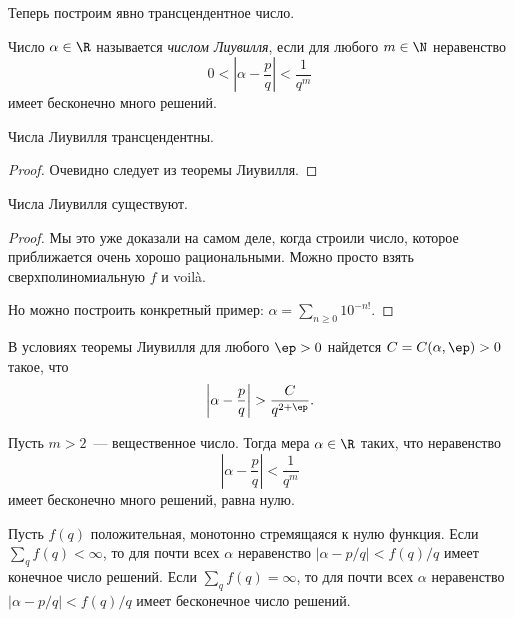 Теперь построим явно трансцендентное число.

\begin{df}
  Число $\alpha \in \R$ называется \emph{числом Лиувилля}, если для любого $m \in \N$ неравенство
  $$
    0 < \left| \alpha - \frac{p}{q} \right| < \frac{1}{q^m}
  $$
  имеет бесконечно много решений.
\end{df}

\begin{theorem}
  Числа Лиувилля трансцендентны.
\end{theorem}
\begin{proof}
  Очевидно следует из теоремы Лиувилля.
\end{proof}

\begin{theorem}
  Числа Лиувилля существуют.
\end{theorem}
\begin{proof}
  Мы это уже доказали на самом деле, когда строили число, которое приближается очень хорошо рациональными. Можно просто взять сверхполиномиальную $f$ и voil\`a.

  Но можно построить конкретный пример: $\alpha = \sum\limits_{n\ge0} 10^{-n!}$.
\end{proof}

\begin{stm}
  В условиях теоремы Лиувилля для любого $\ep > 0$ найдется $C = C(\alpha, \ep) > 0$ такое, что
  $$
    \left| \alpha - \frac{p}{q} \right| > \frac{C}{q^{2+\ep}}.
  $$
\end{stm}

\begin{theorem}[Бореля]
  Пусть $m > 2$~— вещественное число. Тогда мера $\alpha \in \R$ таких, что неравенство
  $$
    \left| \alpha - \frac{p}{q} \right| < \frac{1}{q^m}
  $$
  имеет бесконечно много решений, равна нулю.
\end{theorem}

\begin{theorem}[Хинчина]
  Пусть $f(q)$ положительная, монотонно стремящаяся к нулю функция.
  Если $\displaystyle\sum_{q} f(q) < \infty$, то для почти всех $\alpha$ неравенство $|\alpha - p/q| < f(q) / q$ имеет конечное число решений.
  Если $\displaystyle\sum_{q} f(q) = \infty$, то для почти всех $\alpha$ неравенство $|\alpha - p/q| < f(q) / q$ имеет бесконечное число решений.
\end{theorem}
